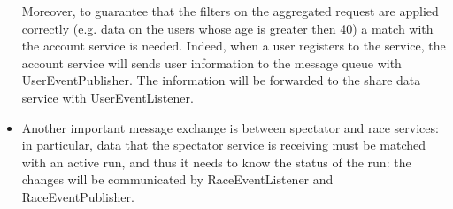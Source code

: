 \begin{itemize}
Moreover, to guarantee that the filters on the aggregated request are applied correctly (e.g. data on the users whose age is greater then 40)
a match with the account service is needed. 
Indeed, when a user registers to the service, the account service will sends user information to the message queue with UserEventPublisher. 
The information will be forwarded to the share data service with UserEventListener.
\item
Another important message exchange is between spectator and race services: in particular, data that the spectator service is receiving must
be matched with an active run, and thus it needs to know the status of the run: the changes will be communicated by 
RaceEventListener and RaceEventPublisher.
\end{itemize}
